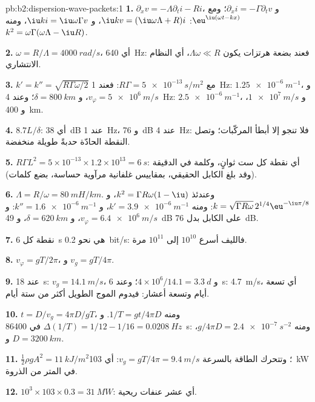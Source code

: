 \begin{solution}{pb:b2:dispersion-wave-packets:1}
\textbf{1.} $\partial_xv = -\Lambda\partial_ti - Ri$، و $\partial_xi = -\Gamma\partial_tv$؛ ومع
$\eu^{\iu(\omega t - kx)}$: $\iu kv = (\iu\omega\Lambda + R)i$، و $\iu ki = \iu\omega\Gamma v$، ومنه
$k^2 = \omega\Gamma(\omega\Lambda - \iu R)$.

\textbf{2.} $\omega = R/\Lambda = \qty{4000}{rad/s}$، أي \qty{640}{Hz}: فعند بضعة هرتزات يكون $\Lambda\omega
\ll R$، أي النظام الانتشاري.

\textbf{3.} $k' = k'' = \sqrt{R\Gamma\omega/2}$ مع $R\Gamma = \qty{5e-13}{s/m^2}$: فعند \qty{1}{Hz}:
$\qty{1.25e-6}{m^{-1}}$، و $v_\varphi = \qty{5e6}{m/s}$، و $\delta = \qty{800}{km}$؛ وعند \qty{4}{Hz}:
$\qty{2.5e-6}{m^{-1}}$، و $\qty{1e7}{m/s}$، و \qty{400}{km}.

\textbf{4.} $8.7L/\delta$: أي \qty{38}{dB} عند \qty{1}{Hz}، و \qty{76}{dB} عند \qty{4}{Hz}: فلا تنجو إلا
أبطأ المركّبات؛ وتصل النقطة الحادّة حدبةً طويلة منخفضة.

\textbf{5.} $R\Gamma L^2 = 5 \times 10^{-13} \times 1.2 \times 10^{13} = \qty{6}{s}$: أي نقطة كل
ست ثوانٍ، وكلمة في الدقيقة (وقد بلغ الكابل الحقيقي، بمقاييس
غلفانية مرآوية حساسة، بضع كلمات).

\textbf{6.} $\Lambda = R/\omega = \qty{80}{mH/km}$. وعندئذ $k^2 = \Gamma R\omega(1 - \iu)$، و $k = \sqrt{\Gamma R\omega}
\,2^{1/4}\eu^{-\iu\pi/8}$: ومنه $k' = \qty{3.9e-6}{m^{-1}}$، و $k'' = \qty{1.6e-6}{m^{-1}}$: و $v_\varphi =
\qty{6.4e6}{m/s}$، و $\delta = \qty{620}{km}$، و \qty{49}{dB} على الكابل بدل
\qty{76}{dB}.

\textbf{7.} نقطة كل \qty{6}{s} هي نحو \qty{0.2}{bit/s}: فالليف أسرع
$10^{10}$ إلى $10^{11}$ مرة.

\textbf{8.} $v_\varphi = gT/2\pi$، و $v_g = gT/4\pi$.

\textbf{9.} عند \qty{18}{s}: $v_g = \qty{14.1}{m/s}$، و $4 \times 10^6/14.1 = \qty{3.3}{d}$؛
وعند \qty{6}{s}: \qty{4.7}{m/s}، أي تسعة أيام وتسعة أعشار: فيدوم الموج الطويل أكثر من ستة أيام.

\textbf{10.} $t = D/v_g = 4\pi D/gT$، ومنه $1/T = gt/4\pi D$. و $\Delta(1/T) = 1/12 - 1/16
= \qty{0.0208}{Hz}$ في \qty{86400}{s}: ومنه $g/4\pi D = \qty{2.4e-7}{s^{-2}}$، و $D = \qty{3200}{km}$.

\textbf{11.} $\tfrac12\rho gA^2 = \qty{11}{kJ/m^2}$؛ وتتحرك الطاقة بالسرعة $v_g = gT/4\pi =
\qty{9.4}{m/s}$: أي \qty{103}{kW} في المتر من الذروة.

\textbf{12.} $10^3 \times 103 \times 0.3 = \qty{31}{MW}$: أي عشر عنفات ريحية.


\end{solution}
